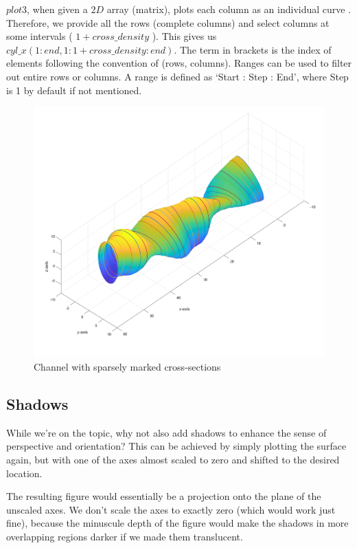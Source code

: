 \documentclass[a4paper]{article}
\begin{document}
\(plot3\), when given a \(2D\) array (matrix), plots each column as an individual curve \cite{mathworks_plot3}. Therefore, we provide all the rows (complete columns) and select columns at some intervals ( \(1+cross\_density\) ). This gives us \(cyl\_x( 1 : end , 1 : 1+cross\_density : end)\). The term in brackets is the index of elements following the convention of (rows, columns). Ranges can be used to filter out entire rows or columns. A range is defined as ‘Start : Step : End', where Step is 1 by default if not mentioned.
\begin{figure}[h!]
    \centering
    \includegraphics[width=0.75\linewidth]{Images/Charted_Tunnel_Right.png}
    \caption{Channel with sparsely marked cross-sections}
\end{figure}

\subsection{Shadows}
While we’re on the topic, why not also add shadows to enhance the sense of perspective and orientation? This can be achieved by simply plotting the surface again, but with one of the axes almost scaled to zero and shifted to the desired location.

The resulting figure would essentially be a projection onto the plane of the unscaled axes. We don’t scale the axes to exactly zero (which would work just fine), because the minuscule depth of the figure would make the shadows in more overlapping regions darker if we made them translucent.
\end{document}

